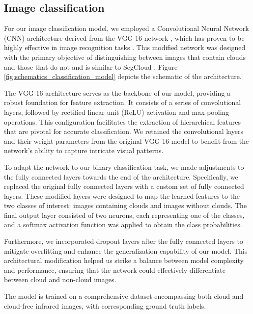 \documentclass[amt, article]{copernicus}
\begin{document}
\subsection{Image classification}

For our image classification model, we employed a Convolutional Neural Network (CNN) architecture derived from the VGG-16 network \citep{simonyan2015deep}, which has proven to be highly effective in image recognition tasks \citep{ canziani2016analysis}. This modified network was designed with the primary objective of distinguishing between images that contain clouds and those that do not and is similar to SegCloud \citep{SegCloud}. Figure \ref{fig:schematics_classification_model} depicts the schematic of the architecture.

The VGG-16 architecture serves as the backbone of our model, providing a robust foundation for feature extraction. It consists of a series of convolutional layers, followed by rectified linear unit (ReLU) activation \citep{agarap2018deep} and max-pooling operations. This configuration facilitates the  extraction of hierarchical features that are pivotal for accurate classification. We retained the convolutional layers and their weight parameters from the original VGG-16 model to benefit from the network's ability to capture intricate visual patterns.

To adapt the network to our binary classification task, we made adjustments to the fully connected layers towards the end of the architecture. Specifically, we replaced the original fully connected layers with a custom set of fully connected layers. These modified layers were designed to map the learned features to the two classes of interest: images containing clouds and images without clouds. The final output layer consisted of two neurons, each representing one of the classes, and a softmax activation function was applied to obtain the class probabilities.

Furthermore, we incorporated dropout layers after the fully connected layers to mitigate overfitting and enhance the generalization capability of our model. This architectural modification helped us strike a balance between model complexity and performance, ensuring that the network could effectively differentiate between cloud and non-cloud images.

The model is trained on a comprehensive dataset encompassing both cloud and cloud-free infrared images, with corresponding ground truth labels.
\end{document}
